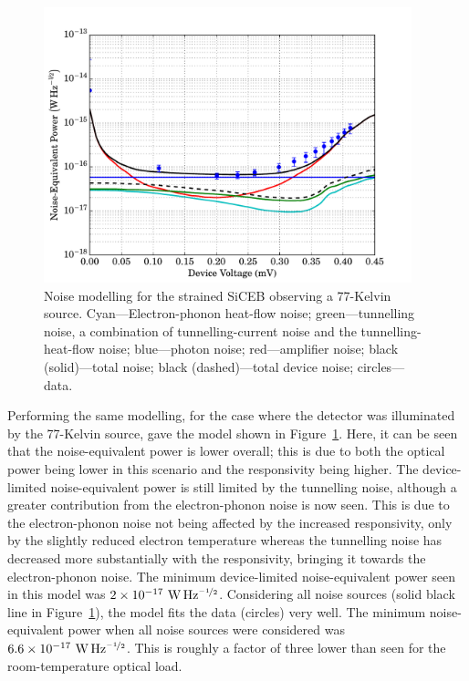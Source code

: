 \begin{figure}[tb]
\begin{center}
\includegraphics[width = 0.95\textwidth]{figures/strained_noiseModel77}
\caption[Noise modelling for the strained SiCEB observing a 77-Kelvin source]{Noise modelling for the strained SiCEB observing a 77-Kelvin source. Cyan---Electron-phonon heat-flow noise; green---tunnelling noise, a combination of tunnelling-current noise and the tunnelling-heat-flow noise; blue---photon noise; red---amplifier noise; black (solid)---total noise; black (dashed)---total device noise; circles---data.}
\label{fig:strainedNoiseModel77}
\end{center}
\end{figure}
\par 
Performing the same modelling, for the case where the detector was illuminated by the 77-Kelvin source, gave the model shown in Figure~\ref{fig:strainedNoiseModel77}. Here, it can be seen that the noise-equivalent power is lower overall; this is due to both the optical power being lower in this scenario and the responsivity being higher. The device-limited noise-equivalent power is still limited by the tunnelling noise, although a greater contribution from the electron-phonon noise is now seen. This is due to the electron-phonon noise not being affected by the increased responsivity, only by the slightly reduced electron temperature whereas the tunnelling noise has decreased more substantially with the responsivity, bringing it towards the electron-phonon noise. The minimum device-limited noise-equivalent power seen in this model was $2 \times 10^{-17}~\mathrm{W\,Hz^{\nicefrac{-1}{2}}}$. Considering all noise sources (solid black line in Figure~\ref{fig:strainedNoiseModel77}), the model fits the data (circles) very well. The minimum noise-equivalent power when all noise sources were considered was $6.6 \times 10^{-17}~\mathrm{W\,Hz^{\nicefrac{-1}{2}}}$. This is roughly a factor of three lower than seen for the room-temperature optical load.
